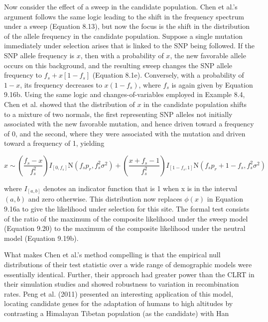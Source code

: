 \documentclass{article}
\begin{document}
Now consider the effect of a sweep in the candidate population. Chen et al.'s argument follows the same logic leading to the shift in the frequency spectrum under a sweep (Equation 8.13), but now the focus is the shift in the distribution of the allele frequency in the candidate population. Suppose a single mutation immediately under selection arises that is linked to the SNP being followed. If the SNP allele frequency is $x$, then with a probability of $x$, the new favorable allele occurs on this background, and the resulting sweep changes the SNP allele frequency to $f_{s} + x [1 - f_{s}]$ (Equation 8.1e). Conversely, with a probability of $1 - x$, its frequency decreases to $x (1 - f_{s})$, where $f_{s}$ is again given by Equation 9.16b. Using the same logic and changes-of-variables employed in Example 8.4, Chen et al. showed that the distribution of $x$ in the candidate population shifts to a mixture of two normals, the first representing SNP alleles not initially associated with the new favorable mutation, and hence driven toward a frequency of 0, and the second, where they were associated with the mutation and driven toward a frequency of 1, yielding

\begin{equation}
x\sim\left(\frac{f_{s}-x}{f_{s}^{2}}\right)I_{\left[0,f_{s}\right]}\mathrm{N}\left(f_{s}p_{r},f_{s}^{2}\sigma^{2}\right)+\left(\frac{x+f_{s}-1}{f_{s}^{2}}\right)I_{\left[1-f_{s},1\right]}\mathrm{N}\left(f_{s}p_{r}+1-f_{s},f_{s}^{2}\sigma^{2}\right)
\tag{9.20}
\label{eq:9_20}
\end{equation}

where  $ I_{[a,b]} $ denotes an indicator function that is 1 when x is in the interval  $ (a,b) $ and zero otherwise. This distribution now replaces  $ \phi(x) $ in Equation 9.16a to give the likelihood under selection for this site. The formal test consists of the ratio of the maximum of the composite likelihood under the sweep model (Equation 9.20) to the maximum of the composite likelihood under the neutral model (Equation 9.19b).

What makes Chen et al.'s method compelling is that the empirical null distributions of their test statistic over a wide range of demographic models were essentially identical. Further, their approach had greater power than the CLRT in their simulation studies and showed robustness to variation in recombination rates. Peng et al. (2011) presented an interesting application of this model, locating candidate genes for the adaptation of humans to high altitudes by contrasting a Himalayan Tibetan population (as the candidate) with Han
\end{document}
